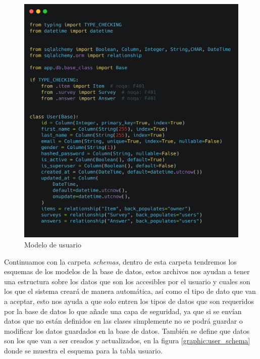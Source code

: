 \begin{figure}[!htb]
    \centering
    \includegraphics[scale=.15]{TT/img/implementacion/user-model.png}
    \caption{Modelo de usuario}
    \label{graphic:user_model}    
\end{figure}

Continuamos con la carpeta \textit{schemas}, dentro de esta carpeta tendremos los esquemas de los modelos de la base de datos, estos archivos nos ayudan a tener una estructura sobre los datos que son los accesibles por el usuario y cuales son los que el sistema creará de manera automática, así como el tipo de dato que van a aceptar, esto nos ayuda a que solo entren los tipos de datos que son requeridos por la base de datos lo que añade una capa de seguridad, ya que si se envían datos que no están definidos en las clases simplemente no se podrá guardar o modificar los datos guardados en la base de datos. También se define que datos son los que van a ser creados y actualizados, en la figura \ref{graphic:user_schema} donde se muestra el esquema para la tabla usuario.

